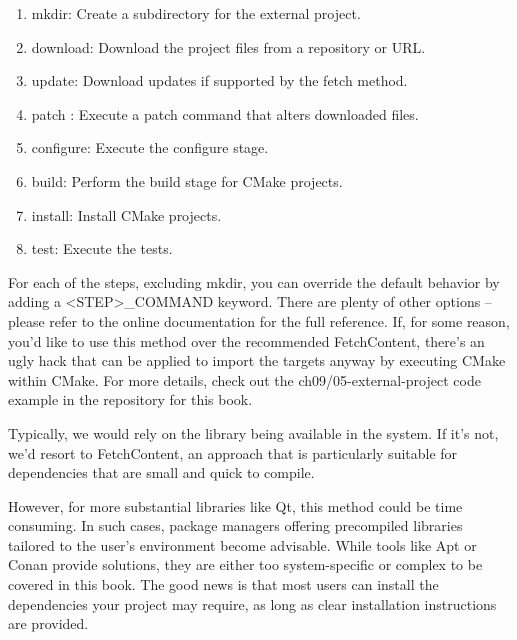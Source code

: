 \begin{enumerate}
\item
mkdir: Create a subdirectory for the external project.

\item
download: Download the project files from a repository or URL.

\item
update: Download updates if supported by the fetch method.

\item
patch : Execute a patch command that alters downloaded files.

\item
configure: Execute the configure stage.

\item
build: Perform the build stage for CMake projects.

\item
install: Install CMake projects.

\item
test: Execute the tests.
\end{enumerate}

For each of the steps, excluding mkdir, you can override the default behavior by adding a <STEP>\_COMMAND keyword. There are plenty of other options – please refer to the online documentation for the full reference. If, for some reason, you’d like to use this method over the recommended FetchContent, there’s an ugly hack that can be applied to import the targets anyway by executing CMake within CMake. For more details, check out the ch09/05-external-project code example in the repository for this book.

Typically, we would rely on the library being available in the system. If it’s not, we’d resort to FetchContent, an approach that is particularly suitable for dependencies that are small and quick to compile.

However, for more substantial libraries like Qt, this method could be time consuming. In such cases, package managers offering precompiled libraries tailored to the user’s environment become advisable. While tools like Apt or Conan provide solutions, they are either too system-specific or complex to be covered in this book. The good news is that most users can install the dependencies your project may require, as long as clear installation instructions are provided.




